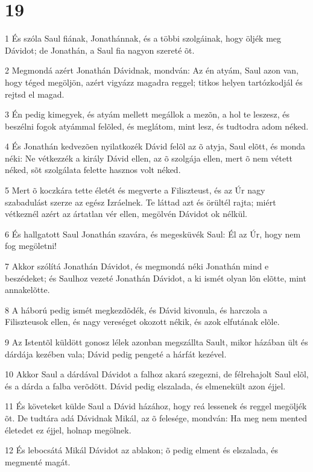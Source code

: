 \chapter{19}

\par 1 És szóla Saul fiának, Jonathánnak, és a többi szolgáinak, hogy öljék meg Dávidot; de Jonathán, a Saul fia nagyon szereté õt.
\par 2 Megmondá azért Jonathán Dávidnak, mondván: Az én atyám, Saul azon van, hogy téged megöljön, azért vigyázz magadra reggel; titkos helyen tartózkodjál és rejtsd el magad.
\par 3 Én pedig kimegyek, és atyám mellett megállok a mezõn, a hol te leszesz, és beszélni fogok atyámmal felõled, és meglátom, mint lesz, és tudtodra adom néked.
\par 4 És Jonathán kedvezõen nyilatkozék Dávid felõl az õ atyja, Saul elõtt, és monda néki: Ne vétkezzék a király Dávid ellen, az õ szolgája ellen, mert õ nem vétett néked, sõt szolgálata felette hasznos volt néked.
\par 5 Mert õ koczkára tette életét és megverte a Filiszteust, és az Úr nagy szabadulást szerze az egész Izráelnek. Te láttad azt és örültél rajta; miért vétkeznél azért az ártatlan vér ellen, megölvén Dávidot ok nélkül.
\par 6 És hallgatott Saul Jonathán szavára, és megesküvék Saul: Él az Úr, hogy nem fog megöletni!
\par 7 Akkor szólítá Jonathán Dávidot, és megmondá néki Jonathán mind e beszédeket; és Saulhoz vezeté Jonathán Dávidot, a ki ismét olyan lõn elõtte, mint annakelõtte.
\par 8 A háború pedig ismét megkezdõdék, és Dávid kivonula, és harczola a Filiszteusok ellen, és nagy vereséget okozott nékik, és azok elfutának elõle.
\par 9 Az Istentõl küldött gonosz lélek azonban megszállta Sault, mikor házában ült és dárdája kezében vala; Dávid pedig pengeté a hárfát kezével.
\par 10 Akkor Saul a dárdával Dávidot a falhoz akará szegezni, de félrehajolt Saul elõl, és a dárda a falba verõdött. Dávid pedig elszalada, és elmenekült azon éjjel.
\par 11 És követeket külde Saul a Dávid házához, hogy reá lessenek és reggel megöljék õt. De tudtára adá Dávidnak Mikál, az õ felesége, mondván: Ha meg nem mented életedet ez éjjel, holnap megölnek.
\par 12 És lebocsátá Mikál Dávidot az ablakon; õ pedig elment és elszalada, és megmenté magát.
